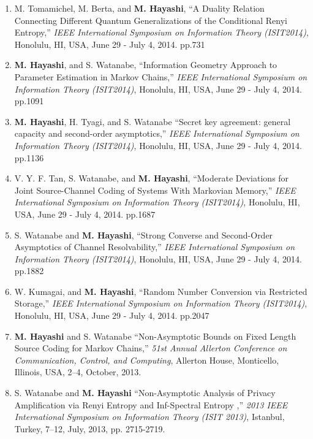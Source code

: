 \documentclass[a4paper,12pt,oneside]{article}
\begin{document}
\begin{enumerate}
    \item
    M. Tomamichel, M. Berta, and \textbf{M. Hayashi}, 
    ``A Duality Relation Connecting Different Quantum Generalizations of the Conditional Renyi Entropy,'' 
    {\em IEEE International Symposium on Information Theory (ISIT2014)}, 
    Honolulu, HI, USA, June 29 - July 4, 2014. pp.731
    
    \item
    \textbf{M. Hayashi}, and S. Watanabe, 
    ``Information Geometry Approach to Parameter Estimation in Markov Chains,'' {\em IEEE International Symposium on Information Theory (ISIT2014)}, Honolulu, HI, USA, June 29 - July 4, 2014. pp.1091
    
    \item
    \textbf{M. Hayashi}, H. Tyagi, and S. Watanabe 
    ``Secret key agreement: general capacity and second-order asymptotics,'' 
    {\em IEEE International Symposium on Information Theory (ISIT2014)}, Honolulu, HI, USA, June 29 - July 4, 2014. pp.1136
    
    \item
    V. Y. F. Tan, S. Watanabe, and \textbf{M. Hayashi}, 
    ``Moderate Deviations for Joint Source-Channel Coding of Systems With Markovian Memory,'' 
    {\em IEEE International Symposium on Information Theory (ISIT2014)}, Honolulu, HI, USA, June 29 - July 4, 2014. pp.1687
    
    \item
    S. Watanabe and \textbf{M. Hayashi}, 
    ``Strong Converse and Second-Order Asymptotics of Channel Resolvability,''
    {\em IEEE International Symposium on Information Theory (ISIT2014)}, Honolulu, HI, USA, June 29 - July 4, 2014. pp.1882
    
    \item
    W. Kumagai, and \textbf{M. Hayashi}, 
    ``Random Number Conversion via Restricted Storage,'' 
    {\em IEEE International Symposium on Information Theory (ISIT2014)}, Honolulu, HI, USA, June 29 - July 4, 2014. pp.2047
    
    \item
    \textbf{M. Hayashi} and S. Watanabe
    ``Non-Asymptotic Bounds on Fixed Length Source Coding for Markov Chains,''
    {\em 51st Annual Allerton Conference on Communication, Control, and Computing}, 
    Allerton House, Monticello, Illinois, USA, 2--4, October, 2013.
    
    \item
    S. Watanabe and \textbf{M. Hayashi}
    ``Non-Asymptotic Analysis of Privacy Amplification via Renyi Entropy and Inf-Spectral Entropy ,'' 
    {\em 2013 IEEE International Symposium on Information Theory (ISIT 2013)}, 
    Istanbul, Turkey, 7--12, July, 2013, pp. 2715-2719.
    

\end{enumerate}
\end{document}
